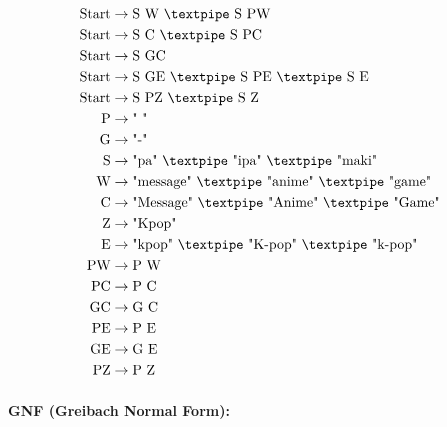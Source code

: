 \begin{equation*}
    \begin{aligned}
        \text{Start}  & \rightarrow \text{S W {\textpipe} S PW}   \\
        \text{Start}  & \rightarrow \text{S C {\textpipe} S PC}   \\
        \text{Start}  & \rightarrow \text{S GC}   \\
        \text{Start}  & \rightarrow \text{S GE {\textpipe} S PE {\textpipe} S E} \\   
        \text{Start}  & \rightarrow \text{S PZ {\textpipe} S Z}      \\
        \text{P}   & \rightarrow \text{" "}\\
        \text{G} & \rightarrow \text{"-"}\\        
        \text{S}    & \rightarrow \text{"pa" {\textpipe} "ipa" {\textpipe} "maki"}\\        
        \text{W} & \rightarrow \text{"message" {\textpipe} "anime" {\textpipe} "game"}\\
        \text{C} & \rightarrow \text{"Message" {\textpipe} "Anime" {\textpipe} "Game"}\\
        \text{Z} & \rightarrow \text{"Kpop"}\\        
        \text{E} & \rightarrow \text{"kpop" {\textpipe} "K-pop" {\textpipe} "k-pop"}\\
        \text{PW} & \rightarrow \text{P W}\\    
        \text{PC} & \rightarrow \text{P C}\\        
        \text{GC} & \rightarrow \text{G C}\\        
        \text{PE} & \rightarrow \text{P E}\\     
        \text{GE} & \rightarrow \text{G E}\\
        \text{PZ} & \rightarrow \text{P Z}
    \end{aligned}
\end{equation*}

\paragraph{GNF (Greibach Normal Form):}

